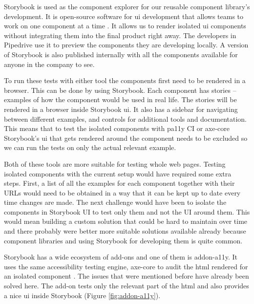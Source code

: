 \documentclass{master_thesis}
\begin{document}
Storybook is used as the component explorer for our reusable component library's development. It is open-source software for \ac{ui} development that allows teams to work on one component at a time \citep{storybook}. It allows us to render isolated \ac{ui} components without integrating them into the final product right away. The developers in Pipedrive use it to preview the components they are developing locally. A version of Storybook is also published internally with all the components available for anyone in the company to see.

To run these tests with either tool the components first need to be rendered in a browser. This can be done by using Storybook. Each component has stories – examples of how the component would be used in real life. The stories will be rendered in a browser inside Storybook \ac{ui}. It also has a sidebar for navigating between different examples, and controls for additional tools and documentation.
This means that to test the isolated components with pa11y CI or axe-core Storybook's \ac{ui} that gets rendered around the component needs to be excluded so we can run the tests on only the actual relevant example.

Both of these tools are more suitable for testing whole web pages. Testing isolated components with the current setup would have required some extra steps. First, a list of all the examples for each component together with their URLs would need to be obtained in a way that it can be kept up to date every time changes are made. The next challenge would have been to isolate the components in Storybook UI to test only them and not the UI around them. This would mean building a custom solution that could be hard to maintain over time and there probably were better more suitable solutions available already because component libraries and using Storybook for developing them is quite common.

Storybook has a wide ecosystem of add-ons and one of them is addon-a11y. It uses the same accessibility testing engine, axe-core to audit the \ac{html} rendered for an isolated component \citep{addon-a11y}. The issues that were mentioned before have already been solved here. The add-on tests only the relevant part of the \ac{html} and also provides a nice \ac{ui} inside Storybook (Figure \ref{fig:addon-a11y}).
\end{document}
